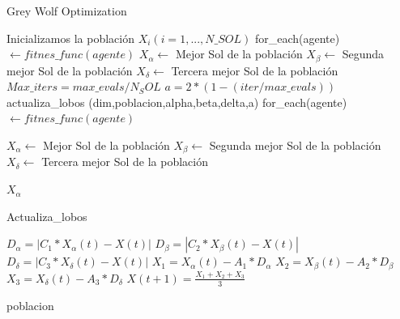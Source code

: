 \documentclass[a4paper, 12.5pt]{report}
\begin{document}
    \begin{algorithm}[H]
        \caption{Grey Wolf Optimization}\label{alg:GWO}
        \begin{algorithmic}[1]
                \State Inicializamos la población $X_i (i=1,...,N\_SOL)$
                \State for\_each(agente) $ \gets fitnes\_func(agente)$
                \State $X_\alpha \gets$ Mejor Sol de la población
                \State $X_\beta \gets$ Segunda mejor Sol de la población
                \State $X_\delta \gets$ Tercera mejor Sol de la población
                \State $Max\_iters=max\_evals/N_SOL$
                    \State $a=2*(1-(iter/max\_evals))$
                    \State actualiza\_lobos (dim,poblacion,alpha,beta,delta,a)
                    \State for\_each(agente) $ \gets fitnes\_func(agente)$

                    \State $X_\alpha \gets$ Mejor Sol de la población
                    \State $X_\beta \gets$ Segunda mejor Sol de la población
                    \State $X_\delta \gets$ Tercera mejor Sol de la población


                \EndFor

                \Return $X_\alpha $
            \EndFunction


        \end{algorithmic}
    \end{algorithm}


    \begin{algorithm}[H]
        \caption{Actualiza\_lobos}\label{alg:AW}
        \begin{algorithmic}[1]

                    \State $D_\alpha=|C_1*X_\alpha(t)-X(t)| $
                    \State $D_\beta=|C_2*X_\beta(t)-X(t)| $
                    \State $D_\delta=|C_3*X_\delta(t)-X(t)| $
                    \State $X_1=X_\alpha(t)-A_1*D_\alpha$
                    \State $X_2=X_\beta(t)-A_2*D_\beta$
                    \State $X_3=X_\delta(t)-A_3*D_\delta$
                    \State $X(t+1)=\frac{X_1+X_2+X_3}{3}$ 
                    
                \Endfor
                \Return poblacion
            \EndFunction


        \end{algorithmic}
    \end{algorithm}
\end{document}
